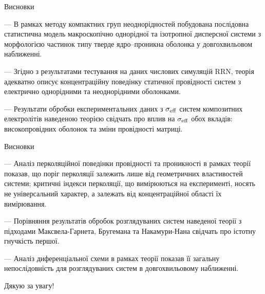 \documentclass[10pt]{beamer}
\begin{document}
\begin{frame}{Висновки}

--- В рамках методу компактних груп неоднорідностей побудована послідовна статистична модель макроскопічно однорідної та ізотропної дисперсної системи з морфологією частинок типу тверде ядро--проникна оболонка у довгохвильовом наближенні.\vspace{10pt}

--- Згідно з результатами тестування на даних числових симуляцій RRN, теорія адекватно описує концентраційну поведінку статичної провідності систем з електрично однорідними та неоднорідними оболонками.\vspace{10pt}

--- Результати обробки експериментальних даних з $\sigma_{\rm eff}$ систем композитних електролітів наведеною теорією свідчать про вплив на $\sigma_{\rm eff}$ обох вкладів: високопровідних оболонок та зміни провідності матриці.

\end{frame}
\begin{frame}{Висновки}

--- Аналіз перколяційної поведінки провідності та проникності в рамках теорії показав, що поріг перколяції залежить лише від геометричних властивостей системи; критичні індекси перколяції, що вимірюються на експерименті, носять не універсальний характер, а залежать від концентраційної області їх вимірювання.\vspace{10pt}

--- Порівняння результатів обробок розглядуваних систем наведеної теорії з підходами Максвела-Гарнета, Бругемана та Накамури-Нана свідчать про істотну гнучкість першої.\vspace{10pt}

--- Аналіз диференціальної схеми в рамках теорії показав її загальну непослідовність для розглядуваних систем в довгохвильовому наближенні.

\end{frame}



{
\begin{frame}[standout]
  Дякую за увагу!
\end{frame}
}
\end{document}
